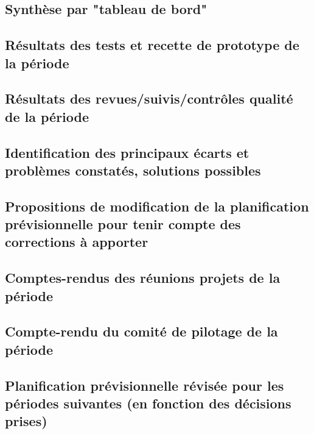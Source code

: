 \documentclass[11pt,a4paper,titlepage,openright]{report}
\begin{document}
    \subsection{Synthèse par "tableau de bord"}

    \subsection{Résultats des tests et recette de prototype de la période}

    \subsection{Résultats des revues/suivis/contrôles qualité de la période}

    \subsection{Identification des principaux écarts et problèmes constatés, solutions possibles}

    \subsection{Propositions de modification de la planification prévisionnelle pour tenir compte des corrections à apporter}

    \subsection{Comptes-rendus des réunions projets de la période}

    \subsection{Compte-rendu du comité de pilotage de la période}

    \subsection{Planification prévisionnelle révisée pour les périodes suivantes (en fonction des décisions prises)}




    \appendix
\end{document}
